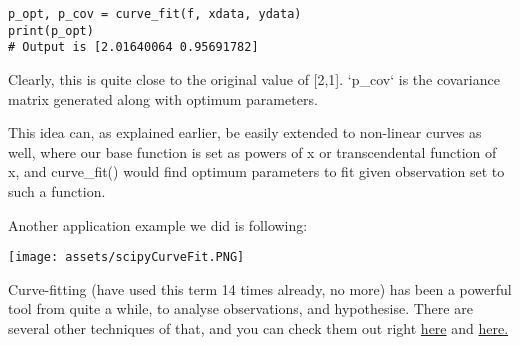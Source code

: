 \documentclass{article}
\begin{document}
\begin{lstlisting}
p_opt, p_cov = curve_fit(f, xdata, ydata)
print(p_opt)
# Output is [2.01640064 0.95691782]
\end{lstlisting}

\vspace{0.4cm}
Clearly, this is quite close to the original value of [2,1]. `p\_cov` is the covariance matrix generated along with optimum parameters.\par
This idea can, as explained earlier, be easily extended to non-linear curves as well, where our base function is set as powers of x or transcendental function of x, and curve\_fit() would find optimum parameters to fit given observation set to such a function.

\pagebreak
Another application example we did is following:
\begin{center}
    \texttt{[image: assets/scipyCurveFit.PNG]}
\end{center}
Curve-fitting (have used this term 14 times already, no more) has been a powerful tool from quite a while, to analyse observations, and hypothesise.
There are several other techniques of that, and you can check them out right \href{https://wikipedia.org/wiki/Curve_fitting}{here} and \href{https://machinelearningmastery.com/curve-fitting-with-python/}{here.}
\end{document}
